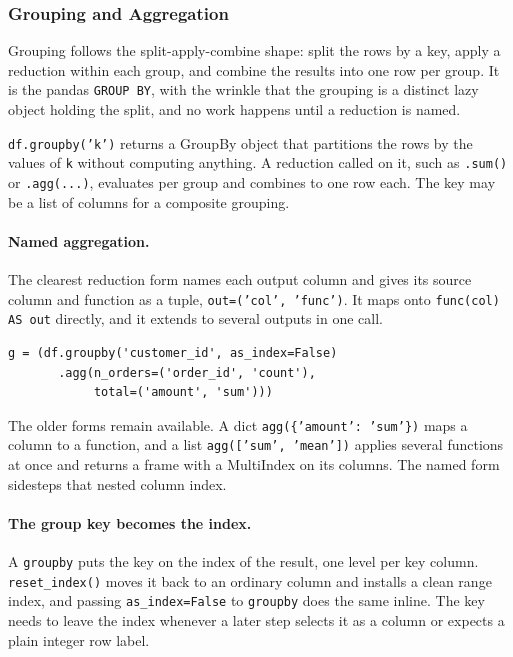 \subsubsection{Grouping and Aggregation}

Grouping follows the split-apply-combine shape: split the rows by a key, apply a reduction within each group, and combine the results into one row per group. It is the pandas \texttt{GROUP BY}, with the wrinkle that the grouping is a distinct lazy object holding the split, and no work happens until a reduction is named.

\vspace{1ex}

\begin{definition}[GroupBy]
\texttt{df.groupby('k')} returns a GroupBy object that partitions the rows by the values of \texttt{k} without computing anything. A reduction called on it, such as \texttt{.sum()} or \texttt{.agg(...)}, evaluates per group and combines to one row each. The key may be a list of columns for a composite grouping.
\end{definition}

\paragraph{Named aggregation.} The clearest reduction form names each output column and gives its source column and function as a tuple, \texttt{out=('col', 'func')}. It maps onto \texttt{func(col) AS out} directly, and it extends to several outputs in one call.

\begin{lstlisting}[style=python, caption={Named aggregation, one row per group}]
g = (df.groupby('customer_id', as_index=False)
       .agg(n_orders=('order_id', 'count'),
            total=('amount', 'sum')))
\end{lstlisting}

\vspace{-1ex}

The older forms remain available. A dict \texttt{agg(\{'amount': 'sum'\})} maps a column to a function, and a list \texttt{agg(['sum', 'mean'])} applies several functions at once and returns a frame with a MultiIndex on its columns. The named form sidesteps that nested column index.

\paragraph{The group key becomes the index.} A \texttt{groupby} puts the key on the index of the result, one level per key column. \texttt{reset\_index()} moves it back to an ordinary column and installs a clean range index, and passing \texttt{as\_index=False} to \texttt{groupby} does the same inline. The key needs to leave the index whenever a later step selects it as a column or expects a plain integer row label.

